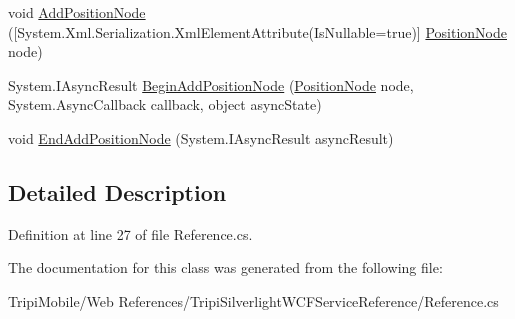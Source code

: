 \begin{DoxyCompactItemize}
\begin{DoxyCompactList}\small\item\em \item\end{DoxyCompactList}\item 
\hypertarget{class_tripi_1_1_tripi_w_c_f_service_1_1_tripi_silverlight_w_c_f_service_a4d1963ad45de8d126a864ec4e3521ba5}{
void \hyperlink{class_tripi_1_1_tripi_w_c_f_service_1_1_tripi_silverlight_w_c_f_service_a4d1963ad45de8d126a864ec4e3521ba5}{AddPositionNode} (\mbox{[}System.Xml.Serialization.XmlElementAttribute(IsNullable=true)\mbox{]} \hyperlink{class_tripi_1_1_tripi_w_c_f_service_1_1_position_node}{PositionNode} node)}
\label{class_tripi_1_1_tripi_w_c_f_service_1_1_tripi_silverlight_w_c_f_service_a4d1963ad45de8d126a864ec4e3521ba5}

\begin{DoxyCompactList}\small\item\em \item\end{DoxyCompactList}\item 
\hypertarget{class_tripi_1_1_tripi_w_c_f_service_1_1_tripi_silverlight_w_c_f_service_a414b08680265297f8e6537b7b3782d06}{
System.IAsyncResult \hyperlink{class_tripi_1_1_tripi_w_c_f_service_1_1_tripi_silverlight_w_c_f_service_a414b08680265297f8e6537b7b3782d06}{BeginAddPositionNode} (\hyperlink{class_tripi_1_1_tripi_w_c_f_service_1_1_position_node}{PositionNode} node, System.AsyncCallback callback, object asyncState)}
\label{class_tripi_1_1_tripi_w_c_f_service_1_1_tripi_silverlight_w_c_f_service_a414b08680265297f8e6537b7b3782d06}

\begin{DoxyCompactList}\small\item\em \item\end{DoxyCompactList}\item 
\hypertarget{class_tripi_1_1_tripi_w_c_f_service_1_1_tripi_silverlight_w_c_f_service_a2899d8e08adae288f84559851c396a9d}{
void \hyperlink{class_tripi_1_1_tripi_w_c_f_service_1_1_tripi_silverlight_w_c_f_service_a2899d8e08adae288f84559851c396a9d}{EndAddPositionNode} (System.IAsyncResult asyncResult)}
\label{class_tripi_1_1_tripi_w_c_f_service_1_1_tripi_silverlight_w_c_f_service_a2899d8e08adae288f84559851c396a9d}

\begin{DoxyCompactList}\small\item\em \item\end{DoxyCompactList}\end{DoxyCompactItemize}


\subsection{Detailed Description}


Definition at line 27 of file Reference.cs.

The documentation for this class was generated from the following file:\begin{DoxyCompactItemize}
\item 
TripiMobile/Web References/TripiSilverlightWCFServiceReference/Reference.cs\end{DoxyCompactItemize}
